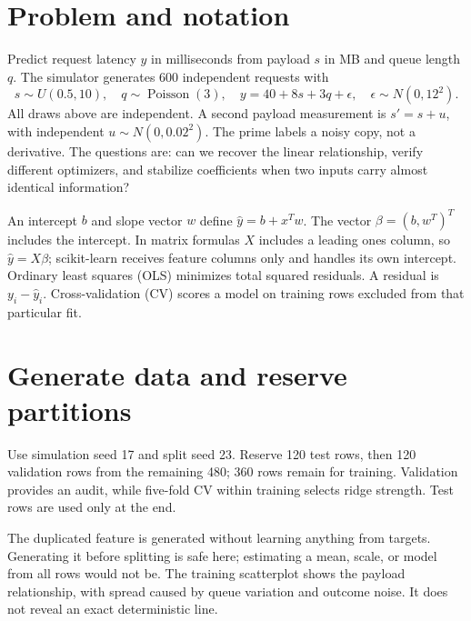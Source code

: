 


\section*{Problem and notation}
Predict request latency $y$ in milliseconds from payload $s$ in MB and queue length $q$.
The simulator generates 600 independent requests with
\[
s\sim U(0.5,10),\quad q\sim\operatorname{Poisson}(3),\quad
 y=40+8s+3q+\epsilon,\quad \epsilon\sim N(0,12^2).
\]
All draws above are independent. A second payload measurement is $s'=s+u$, with independent $u\sim N(0,0.02^2)$. The prime labels a noisy copy, not a derivative.
The questions are: can we recover the linear relationship, verify different optimizers, and stabilize coefficients when two inputs carry almost identical information?

An intercept $b$ and slope vector $w$ define $\hat y=b+x^Tw$.
The vector $\beta=(b,w^T)^T$ includes the intercept. In matrix formulas $X$ includes a leading ones column, so $\hat y=X\beta$; scikit-learn receives feature columns only and handles its own intercept.
Ordinary least squares (OLS) minimizes total squared residuals. A residual is $y_i-\hat y_i$.
Cross-validation (CV) scores a model on training rows excluded from that particular fit.

\section{Generate data and reserve partitions}
Use simulation seed 17 and split seed 23. Reserve 120 test rows, then 120 validation rows from the remaining 480; 360 rows remain for training. Validation provides an audit, while five-fold CV within training selects ridge strength. Test rows are used only at the end.

The duplicated feature is generated without learning anything from targets. Generating it before splitting is safe here; estimating a mean, scale, or model from all rows would not be.
The training scatterplot shows the payload relationship, with spread caused by queue variation and outcome noise. It does not reveal an exact deterministic line.

